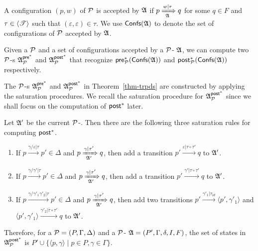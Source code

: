 A configuration $(p, w)$ of ${\mathcal{P} }$ is accepted by ${\mathfrak{A} }$ if $p \xRightarrow[{\mathfrak{A} }]{w | \tau} q$ for some $q \in F$ and $\tau \in \langle {\mathscr{T} } \rangle$ such that $(\varepsilon, \varepsilon) \in \tau$.
We use ${\mathsf{Confs} }({\mathfrak{A} })$ to denote the set of configurations of ${\mathcal{P} }$ accepted by ${\mathfrak{A} }$.


\begin{theorem}\label{thm-trpds}
	Given  a {\TrPDS} ${\mathcal{P} }$ and a set of configurations accepted by a ${\mathcal{P} }$-{\TrNFA} ${\mathfrak{A} }$, we can compute two ${\mathcal{P} }$-{\TrNFA}s ${\mathfrak{A} }^{{\mathsf{pre} }^*}_{{\mathcal{P} }}$  and ${\mathfrak{A} }^{{\mathsf{post} }^*}_{{\mathcal{P} }}$ that recognize ${\mathsf{pre} }^*_{\mathcal{P} }({\mathsf{Confs} }({\mathfrak{A} }))$ and ${\mathsf{post} }^*_{\mathcal{P} }({\mathsf{Confs} }({\mathfrak{A} }))$ respectively.
\end{theorem}

The ${\mathcal{P} }$-{\TrNFA}s ${\mathfrak{A} }^{{\mathsf{pre} }^*}_{{\mathcal{P} }}$ and ${\mathfrak{A} }^{{\mathsf{post} }^*}_{{\mathcal{P} }}$ in Theorem~\ref{thm-trpds} are constructed by applying the saturation procedures. We recall the saturation procedure for ${\mathfrak{A} }^{{\mathsf{post} }^*}_{{\mathcal{P} }}$ since we shall focus on the computation of ${\mathsf{post} }^*$  later.

Let ${\mathfrak{A} }'$ be the current ${\mathcal{P} }$-\TrNFA. Then there are the following three saturation rules for computing ${\mathsf{post} }^*$. 

\smallskip
\fbox
{
\begin{minipage}{0.9\textwidth}
\begin{enumerate}
    \item If $p \xrightarrow{\gamma/\varepsilon | \tau} p' \in \Delta$ and $p \xRightarrow[{\mathfrak{A} }']{\gamma | \tau' } q$, then add a transition $p' \xrightarrow{\varepsilon | \tau \circ \tau'} q$ to ${\mathfrak{A} }'$. 
%
    \item If $p \xrightarrow{\gamma/\gamma' | \tau} p' \in \Delta$ and $p \xRightarrow[{\mathfrak{A} }']{\gamma | \tau' } q$, then add a transition $p' \xrightarrow{\gamma' | \tau \circ \tau'} q$ to ${\mathfrak{A} }'$. 
%
    \item If $p \xrightarrow{\gamma/\gamma'_1 \gamma'_2 | \tau} p' \in \Delta$ and $p \xRightarrow[{\mathfrak{A} }']{\gamma | \tau' } q$, then add two transitions $p' \xrightarrow{\gamma'_1 | \tau_{id}} \langle p', \gamma'_1\rangle$ and $\langle p', \gamma'_1\rangle \xrightarrow{\gamma'_2 | \overline{\tau} \circ \tau' } q$ to ${\mathfrak{A} }'$.  
\end{enumerate}
\end{minipage}
}

\smallskip

Therefore, for a {\TrPDS} ${\mathcal{P} }=(P,\Gamma,\Delta)$ and a ${\mathcal{P} }$-{\TrNFA} ${\mathfrak{A} } = (P', \Gamma, \delta, I, F)$, the set of states in ${\mathfrak{A} }^{{\mathsf{post} }^*}_{\mathcal{P} }$ is $P' \cup \{\langle p, \gamma \rangle \mid p \in P, \gamma \in \Gamma \}$.


